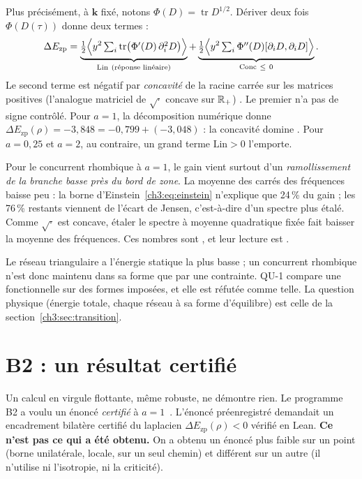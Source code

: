 Plus précisément, à $\mathbf k$ fixé, notons $\Phi(D)=\operatorname{tr}D^{1/2}$. Dériver deux fois
$\Phi(D(\tau))$ donne deux termes :
\[
\Delta E_{\mathrm{zp}}=\underbrace{\tfrac12\Bigl\langle y^2\textstyle\sum_i\operatorname{tr}\bigl(\Phi'(D)\,\partial_i^2D\bigr)\Bigr\rangle}_{\mathrm{Lin}\ \text{(réponse linéaire)}}
+\underbrace{\tfrac12\Bigl\langle y^2\textstyle\sum_i\Phi''(D)[\partial_iD,\partial_iD]\Bigr\rangle}_{\mathrm{Conc}\ \le\ 0} .
\]
Le second terme est négatif par \emph{concavité} de la racine carrée sur les matrices positives (l'analogue matriciel de
$\sqrt{\cdot}$ concave sur $\mathbb{R}_+$) \tierC. Le premier n'a pas de signe contrôlé. Pour $a=1$, la décomposition
numérique donne $\Delta E_{\mathrm{zp}}(\rho)=-3{,}848=-0{,}799+(-3{,}048)$ : la concavité domine \tierX. Pour $a=0{,}25$
et $a=2$, au contraire, un grand terme $\mathrm{Lin}>0$ l'emporte.

\begin{physbox}
Pour le concurrent rhombique à $a=1$, le gain vient surtout d'un \emph{ramollissement de la branche basse près du bord
de zone}. La moyenne des carrés des fréquences baisse peu : la borne d'Einstein~\eqref{ch3:eq:einstein} n'explique que
24\,\% du gain ; les 76\,\% restants viennent de l'écart de Jensen, c'est-à-dire d'un spectre plus étalé. Comme
$\sqrt{\cdot}$ est concave, étaler le spectre à moyenne quadratique fixée fait baisser la moyenne des fréquences.
Ces nombres sont \tierX, et leur lecture est \tierC.
\end{physbox}

\begin{warnbox}
Le réseau triangulaire a l'énergie statique la plus basse ; un concurrent rhombique n'est donc maintenu dans sa forme que
par une contrainte. QU-1 compare une fonctionnelle sur des formes imposées, et elle est réfutée comme telle. La question
physique (énergie totale, chaque réseau à sa forme d'équilibre) est celle de la section~\ref{ch3:sec:transition}.
\end{warnbox}

\section{B2 : un résultat certifié}\label{ch3:sec:b2}
Un calcul en virgule flottante, même robuste, ne démontre rien. Le programme B2 a voulu un énoncé \emph{certifié} à
$a=1$~\cite{ch3-b2}. L'énoncé préenregistré demandait un encadrement bilatère certifié du laplacien $\Delta E_{\mathrm{zp}}(\rho)<0$
vérifié en Lean. \textbf{Ce n'est pas ce qui a été obtenu.} On a obtenu un énoncé plus faible sur un point (borne
unilatérale, locale, sur un seul chemin) et différent sur un autre (il n'utilise ni l'isotropie, ni la criticité).

